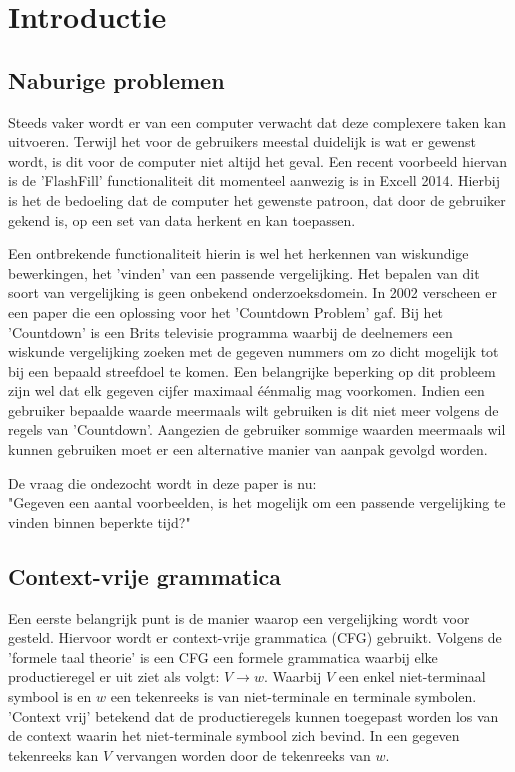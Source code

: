 \documentclass[Main.tex]{subfiles}
\begin{document}
\section{Introductie}
\subsection{Naburige problemen}
Steeds vaker wordt er van een computer verwacht dat deze complexere taken kan uitvoeren. Terwijl het voor de gebruikers meestal duidelijk is wat er gewenst wordt, is dit voor de computer niet altijd het geval. Een recent voorbeeld hiervan is de 'FlashFill' functionaliteit dit momenteel aanwezig is in Excell 2014. Hierbij is het de bedoeling dat de computer het gewenste patroon, dat door de gebruiker gekend is, op een set van data herkent en kan toepassen. \par
Een ontbrekende functionaliteit hierin is wel het herkennen van wiskundige bewerkingen, het 'vinden' van een passende vergelijking. Het bepalen van dit soort van vergelijking is geen onbekend onderzoeksdomein. In 2002 verscheen er een paper die een oplossing voor het 'Countdown Problem' gaf. Bij het 'Countdown' is een Brits televisie programma waarbij de deelnemers een wiskunde vergelijking zoeken met de gegeven nummers om zo dicht mogelijk tot bij een bepaald streefdoel te komen. Een belangrijke beperking op dit probleem zijn wel dat elk gegeven cijfer maximaal \'e\'enmalig mag voorkomen. Indien een gebruiker bepaalde waarde meermaals wilt gebruiken is dit niet meer volgens de regels van 'Countdown'. Aangezien de gebruiker sommige waarden meermaals wil kunnen gebruiken moet er een alternative manier van aanpak gevolgd worden. \par
De vraag die ondezocht wordt in deze paper is nu: \\ "Gegeven een aantal voorbeelden, is het mogelijk om een passende vergelijking te vinden binnen beperkte tijd?"

\subsection{Context-vrije grammatica}
Een eerste belangrijk punt is de manier waarop een vergelijking wordt voor gesteld. Hiervoor wordt er context-vrije grammatica (CFG) gebruikt. Volgens de 'formele taal theorie' is een CFG een formele grammatica waarbij elke productieregel er uit ziet als volgt: $V \rightarrow w$. Waarbij $V$ een enkel niet-terminaal symbool is en $w$ een tekenreeks is van niet-terminale en terminale symbolen. 'Context vrij' betekend dat de productieregels kunnen toegepast worden los van de context waarin het niet-terminale symbool zich bevind. In een gegeven tekenreeks kan $V$ vervangen worden door de tekenreeks van $w$. \\
\end{document}
